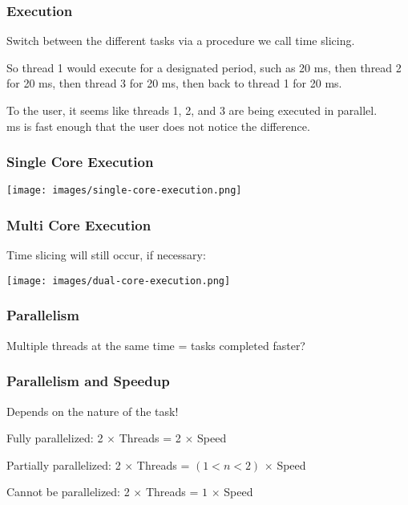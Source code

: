  
\begin{frame}
\frametitle{Execution}

Switch between the different tasks via a procedure we call \alert{time slicing}. 

So thread 1 would execute for a designated period, such as 20 ms, then thread 2 for 20 ms, then thread 3 for 20 ms, then back to thread 1 for 20 ms. 

To the user, it seems like threads 1, 2, and 3 are being executed in parallel.\\
 ms is fast enough that the user does not notice the difference.

\end{frame}

 
\begin{frame}
\frametitle{Single Core Execution}

\begin{center}
	\texttt{[image: images/single-core-execution.png]}
\end{center}

\end{frame}

 
\begin{frame}
\frametitle{Multi Core Execution}

Time slicing will still occur, if necessary:

\begin{center}
	\texttt{[image: images/dual-core-execution.png]}
\end{center}


\end{frame}

 

\begin{frame}
\frametitle{Parallelism}

Multiple threads at the same time = tasks completed faster?

\end{frame}

\begin{frame}
\frametitle{Parallelism and Speedup}

Depends on the nature of the task!

Fully parallelized: 2 $\times$ Threads = 2 $\times$ Speed

Partially parallelized: 2 $\times$ Threads = $(1 < n < 2)$ $\times$ Speed

Cannot be parallelized: 2 $\times$ Threads = $1$ $\times$ Speed

\end{frame}

